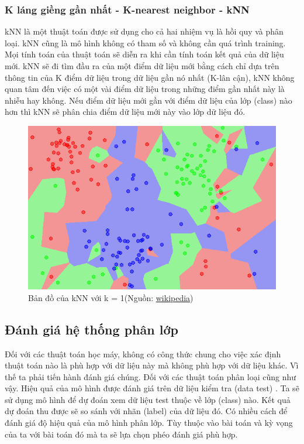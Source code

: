 \documentclass[../DoAn.tex]{subfiles}
\begin{document}
\subsubsection{K láng giềng gần nhất - K-nearest neighbor - kNN}
kNN là một thuật toán được sử dụng cho cả hai nhiệm vụ là hồi quy và phân loại. kNN cũng là mô hình không có tham số  và không cần quá trình training. Mọi tính toán của thuật toán sẽ diễn ra khi cần tính toán kết quả của dữ liệu mới. kNN sẽ đi tìm đầu ra của một điểm dữ liệu mới bằng cách chỉ dựa trên thông tin của K điểm dữ liệu trong dữ liệu gần nó nhất (K-lân cận), kNN không quan tâm đến việc có một vài điểm dữ liệu trong những điểm gần nhất này là nhiễu hay không. Nếu điểm dữ liệu mới gần với điểm dữ liệu của lớp (class) nào hơn thì kNN sẽ phân chia điểm dữ liệu mới này vào lớp dữ liệu đó.

\begin{figure}
    \centering
    \includegraphics[width=1\linewidth]{Hinh_ve/Map1NN.png}
    \caption{Bản đồ của kNN với k = 1(Nguồn: \href{https://en.wikipedia.org/wiki/K-nearest_neighbors_algorithm}{wikipedia})}
    \label{fig:hình3}
\end{figure}

\subsection{Đánh giá hệ thống phân lớp}
Đối với các thuật toán học máy, không có công thức chung cho việc xác định thuật toán nào là phù hợp với dữ liệu này mà không phù hợp với dữ liệu khác. Vì thế ta phải tiến hành đánh giá chúng. Đối với các thuật toán phân loại cũng như vậy. Hiệu quả của mô hình được đánh giá trên dữ liệu kiểm tra (data test) . Ta sẽ sử dụng mô hình để dự đoán xem dữ liệu test thuộc về lớp (class) nào. Kết quả dự đoán thu được sẽ so sánh với nhãn (label) của dữ liệu đó. Có nhiều cách để đánh giá độ hiệu quả của mô hình phân lớp. Tùy thuộc vào bài toán và kỳ vọng của ta với bài toán đó mà ta sẽ lựa chọn phéo đánh giá phù hợp.
\end{document}
